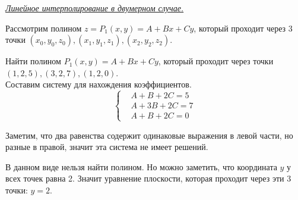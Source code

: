 \documentclass[14pt, a4paper, titlepage, fleqn]{extarticle}
\begin{document}
    \textit{\underline{Линейное интерполирование в двумерном случае.}}

    Рассмотрим полином \( z = P_1(x,y) = A+Bx+Cy\), который проходит через 
    3 точки \((x_0, y_0, z_0), (x_1, y_1, z_1), (x_2, y_2, z_2)\). 
    
    Найти полином \(P_1(x,y) = A+Bx+Cy\), 
    который проходит через точки \((1,2,5), (3,2,7), (1,2,0)\).
    \\

    Составим систему для нахождения коэффициентов.
    \[
        \left\{
            \begin{split}
                &A + B + 2C = 5 \\
                &A + 3B+ 2C = 7 \\
                &A + B + 2C = 0
            \end{split}
        \right.
    \]
    
    Заметим, что два равенства содержит одинаковые выражения
    в левой части, но разные в правой, значит эта система
    не имеет решений.

    В данном виде нельзя найти полином. Но можно заметить, что координата
    \( y \) у всех точек равна 2. Значит уравнение плоскости, которая проходит
    через эти 3 точки: \( y = 2 \).
\end{document}
